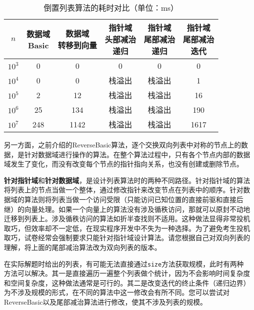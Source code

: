 \begin{table}
  \centering
  \caption{倒置列表算法的耗时对比（单位：ms）}
  \begin{tabular}{c|ccccc}
    \toprule
    $n$ & \thead{数据域\\Basic} & \thead{数据域\\转移到向量} & \thead{指针域\\头部减治\\递归} & \thead{指针域\\尾部减治\\递归} & \thead{指针域\\尾部减治\\迭代}  
      \\
    \midrule
    $10^3$ &  0 & 0 & 0 & 0 & 0 \\
    $10^4$ &  0 & 0 & 栈溢出 & 栈溢出 & 1 \\
    $10^5$ &  2 & 12 & 栈溢出 & 栈溢出 & 16 \\
    $10^6$ &  25 & 134 & 栈溢出 & 栈溢出 & 190 \\
    $10^7$ &  248 & 1142 & 栈溢出 & 栈溢出 & 1617 \\
    \bottomrule
  \end{tabular}
  \label{tab:lis2}
\end{table}


另一方面，之前介绍的ReverseBasic算法，逐个交换双向列表中对称的节点上的数据，是针对数据域进行操作的算法。在整个算法过程中，只有各个节点内部的数据域发生了变化，而没有改变每个节点的指针指向关系，也没有创建或删除节点。

\textbf{针对指针域}和\textbf{针对数据域}，是设计列表算法时的两种不同路径。针对指针域的算法将列表上的节点当做一个整体，通过修改指针来改变节点在列表中的顺序。针对数据域的算法则将列表当做一个访问受限（只能访问已知位置的直接前驱和直接后继）的向量处理。如果一个向量上的算法没有涉及循秩访问，那就可以原封不动地迁移到列表上。涉及循秩访问的算法如折半查找则不适用。这种做法显得非常投机取巧，但效率却不一定低，在现实程序开发中不失为一种选择。为了避免考生投机取巧，试卷经常会强制要求只能针对指针域设计算法。请您根据自己对双向列表的理解，将上面的尾部减治算法改为双向列表的版本。

在实际解题时给出的列表，有可能无法直接通过\lstinline{size}方法获取规模，此时有两种方法可以解决。其一是直接遍历一遍整个列表做个统计，因为不会影响时间复杂度和空间复杂度，这种做法通常是可行的。其二是改变迭代的终止条件（递归边界）为不涉及规模的形式，在不同的算法中这一修改会有所不同。您可以尝试对ReverseBasic以及尾部减治算法进行修改，使其不涉及列表的规模。

